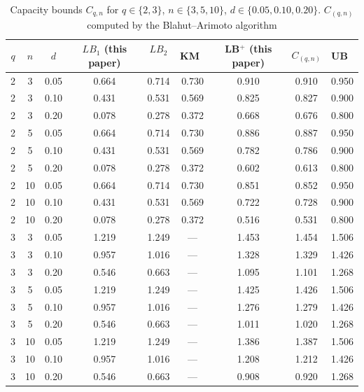 \documentclass[conference]{IEEEtran}
\begin{document}
\begin{table}[ht]
\centering
\caption{Capacity bounds $C_{q,n}$ for $q\in\{2,3\}$, $n\in\{3,5,10\}$, $d\in\{0.05,0.10,0.20\}$. \(C_{(q,n)}\) computed by the Blahut--Arimoto algorithm \cite{blahut1972, arimoto1972}}
\label{tab:compare}
\begin{tabular}{ccc cccc cc}
\toprule
$q$ & $n$ & $d$ & $LB_1$ (this paper) & $LB_2$~\cite{diggavi2001} & KM~\cite{kanoria2013} & LB$^+$ (this paper) & $C_{(q,n)}$ & UB~\cite{mitzenmacher2009} \\
\midrule
2 & 3  & 0.05 & 0.664 & 0.714 & 0.730 & 0.910 & 0.910 & 0.950 \\
2 & 3  & 0.10 & 0.431 & 0.531 & 0.569 & 0.825 & 0.827 & 0.900 \\
2 & 3  & 0.20 & 0.078 & 0.278 & 0.372 & 0.668 & 0.676 & 0.800 \\
\midrule
2 & 5  & 0.05 & 0.664 & 0.714 & 0.730 & 0.886 & 0.887 & 0.950 \\
2 & 5  & 0.10 & 0.431 & 0.531 & 0.569 & 0.782 & 0.786 & 0.900 \\
2 & 5  & 0.20 & 0.078 & 0.278 & 0.372 & 0.602 & 0.613 & 0.800 \\
\midrule
2 & 10 & 0.05 & 0.664 & 0.714 & 0.730 & 0.851 & 0.852 & 0.950 \\
2 & 10 & 0.10 & 0.431 & 0.531 & 0.569 & 0.722 & 0.728 & 0.900 \\
2 & 10 & 0.20 & 0.078 & 0.278 & 0.372 & 0.516 & 0.531 & 0.800 \\
\midrule
3 & 3  & 0.05 & 1.219 & 1.249 & ---   & 1.453 & 1.454 & 1.506 \\
3 & 3  & 0.10 & 0.957 & 1.016 & ---   & 1.328 & 1.329 & 1.426 \\
3 & 3  & 0.20 & 0.546 & 0.663 & ---   & 1.095 & 1.101 & 1.268 \\
\midrule
3 & 5  & 0.05 & 1.219 & 1.249 & ---   & 1.425 & 1.426 & 1.506 \\
3 & 5  & 0.10 & 0.957 & 1.016 & ---   & 1.276 & 1.279 & 1.426 \\
3 & 5  & 0.20 & 0.546 & 0.663 & ---   & 1.011 & 1.020 & 1.268 \\
\midrule
3 & 10 & 0.05 & 1.219 & 1.249 & ---   & 1.386 & 1.387 & 1.506 \\
3 & 10 & 0.10 & 0.957 & 1.016 & ---   & 1.208 & 1.212 & 1.426 \\
3 & 10 & 0.20 & 0.546 & 0.663 & ---   & 0.908 & 0.920 & 1.268 \\
\bottomrule
\end{tabular}
\end{table}
\end{document}

